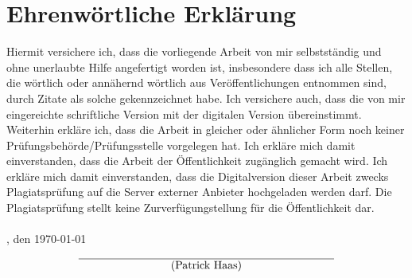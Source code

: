 \documentclass[
    fontsize=12,            %
    BCOR=15mm,              %
    titlepage=true,         %
    DIV=12,                 %
    pagesize=auto,          %
    headings=small,         %
    headinclude=false,
    footinclude=true,
    footlines=2,
    captions=below,         %
    toc=listof,
    hidelinks,
    a4paper
]{scrartcl}
\begin{document}
\newpage
\section*{Ehrenwörtliche Erklärung}
Hiermit versichere ich, dass die vorliegende Arbeit von mir selbstständig und
ohne unerlaubte Hilfe angefertigt worden ist, insbesondere dass ich alle
Stellen, die wörtlich oder annähernd wörtlich aus Veröffentlichungen entnommen
sind, durch Zitate als solche gekennzeichnet habe. Ich versichere auch, dass die
von mir eingereichte schriftliche Version mit der digitalen Version
übereinstimmt. Weiterhin erkläre ich, dass die Arbeit in gleicher oder ähnlicher
Form noch keiner Prüfungsbehörde/Prüfungsstelle vorgelegen hat. Ich erkläre mich
damit einverstanden, dass die Arbeit der Öffentlichkeit zugänglich gemacht wird.
Ich erkläre mich damit einverstanden, dass die Digitalversion dieser Arbeit
zwecks Plagiatsprüfung auf die Server externer Anbieter hochgeladen werden darf.
Die Plagiatsprüfung stellt keine Zurverfügungstellung für die Öffentlichkeit
dar.
\\
\\
\noindent \texplatelocation, den \today
\begin{flushright}
$$\overline{~~~~~~~~~~~~~~~~~~~~~~~~~\mbox{(Patrick~Haas)}~~~~~~~~~~~~~~~~~~~~~~~~~}$$
\end{flushright}
\end{document}
